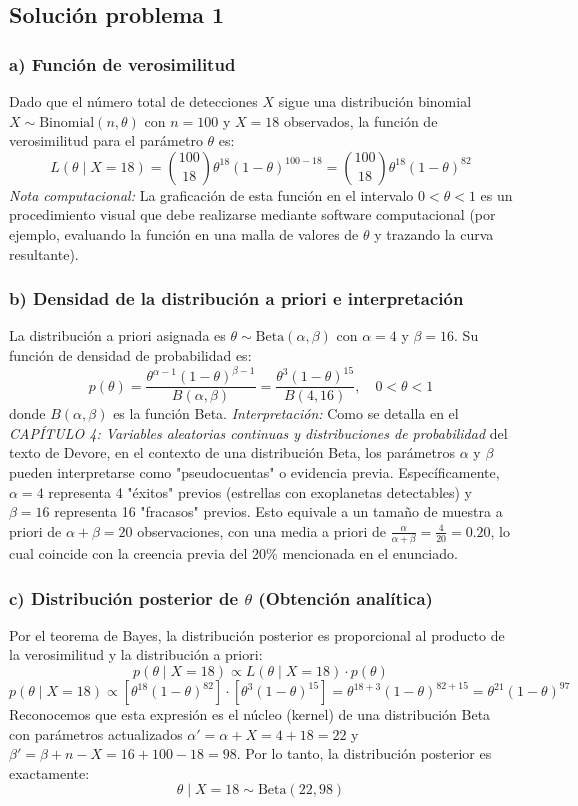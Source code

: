 \documentclass[12pt]{article}
\begin{document}
\subsection{Solución problema 1}

\subsubsection*{a) Función de verosimilitud}
Dado que el número total de detecciones $X$ sigue una distribución binomial $X \sim \text{Binomial}(n, \theta)$ con $n = 100$ y $X = 18$ observados, la función de verosimilitud para el parámetro $\theta$ es:
$$
L(\theta \mid X=18) = \binom{100}{18} \theta^{18} (1-\theta)^{100-18} = \binom{100}{18} \theta^{18} (1-\theta)^{82}
$$
\textit{Nota computacional:} La graficación de esta función en el intervalo $0 < \theta < 1$ es un procedimiento visual que debe realizarse mediante software computacional (por ejemplo, evaluando la función en una malla de valores de $\theta$ y trazando la curva resultante).

\subsubsection*{b) Densidad de la distribución a priori e interpretación}
La distribución a priori asignada es $\theta \sim \text{Beta}(\alpha, \beta)$ con $\alpha = 4$ y $\beta = 16$. Su función de densidad de probabilidad es:
$$
p(\theta) = \frac{\theta^{\alpha-1}(1-\theta)^{\beta-1}}{B(\alpha, \beta)} = \frac{\theta^{3}(1-\theta)^{15}}{B(4, 16)}, \quad 0 < \theta < 1
$$
donde $B(\alpha, \beta)$ es la función Beta. 
\textit{Interpretación:} Como se detalla en el \textit{CAPÍTULO 4: Variables aleatorias continuas y distribuciones de probabilidad} del texto de Devore, en el contexto de una distribución Beta, los parámetros $\alpha$ y $\beta$ pueden interpretarse como "pseudocuentas" o evidencia previa. Específicamente, $\alpha = 4$ representa 4 "éxitos" previos (estrellas con exoplanetas detectables) y $\beta = 16$ representa 16 "fracasos" previos. Esto equivale a un tamaño de muestra a priori de $\alpha + \beta = 20$ observaciones, con una media a priori de $\frac{\alpha}{\alpha+\beta} = \frac{4}{20} = 0.20$, lo cual coincide con la creencia previa del 20\% mencionada en el enunciado.

\subsubsection*{c) Distribución posterior de $\theta$ (Obtención analítica)}
Por el teorema de Bayes, la distribución posterior es proporcional al producto de la verosimilitud y la distribución a priori:
$$
p(\theta \mid X=18) \propto L(\theta \mid X=18) \cdot p(\theta)
$$
$$
p(\theta \mid X=18) \propto \left[ \theta^{18} (1-\theta)^{82} \right] \cdot \left[ \theta^{3} (1-\theta)^{15} \right] = \theta^{18+3} (1-\theta)^{82+15} = \theta^{21} (1-\theta)^{97}
$$
Reconocemos que esta expresión es el núcleo (kernel) de una distribución Beta con parámetros actualizados $\alpha' = \alpha + X = 4 + 18 = 22$ y $\beta' = \beta + n - X = 16 + 100 - 18 = 98$. Por lo tanto, la distribución posterior es exactamente:
$$
\theta \mid X=18 \sim \text{Beta}(22, 98)
$$
\end{document}
